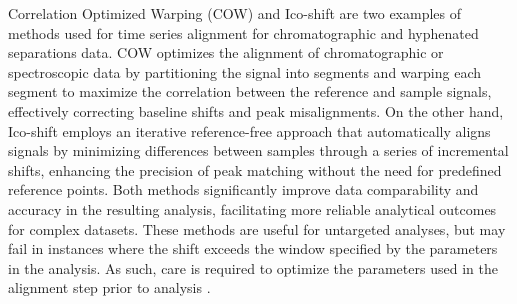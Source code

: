 \documentclass[preprint,12pt]{elsarticle}
\begin{document}
Correlation Optimized Warping (COW) \cite{tomasi2004correlation} and Ico-shift \cite{savorani2010icoshift} are two examples of methods used for time series alignment for chromatographic and hyphenated separations data. COW optimizes the alignment of chromatographic or spectroscopic data by partitioning the signal into segments and warping each segment to maximize the correlation between the reference and sample signals, effectively correcting baseline shifts and peak misalignments. On the other hand, Ico-shift employs an iterative reference-free approach that automatically aligns signals by minimizing differences between samples through a series of incremental shifts, enhancing the precision of peak matching without the need for predefined reference points. Both methods significantly improve data comparability and accuracy in the resulting analysis, facilitating more reliable analytical outcomes for complex datasets. These methods are useful for untargeted analyses, but may fail in instances where the shift exceeds the window specified by the parameters in the analysis. As such, care is required to optimize the parameters used in the alignment step prior to analysis \cite{tomasi2004correlation}.
\end{document}
